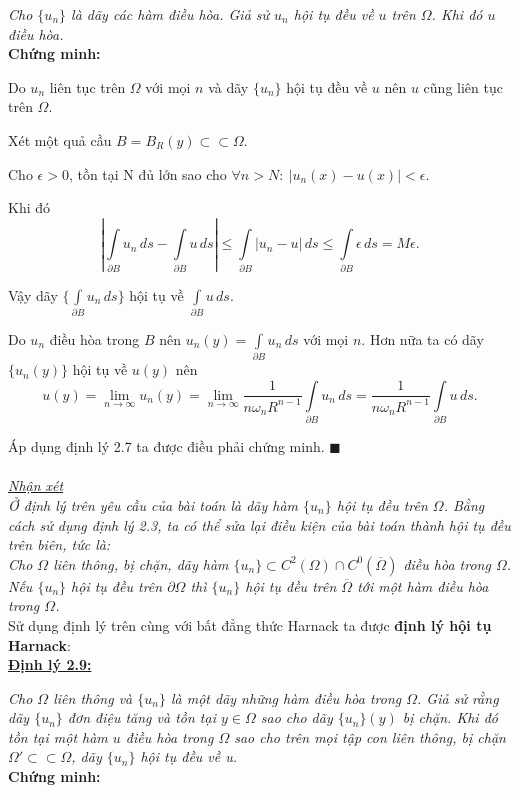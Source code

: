 \textit{Cho $\{u_n\}$ là dãy các hàm điều hòa. Giả sử $u_n$ hội tụ đều về $u$ trên $\Omega$. Khi đó $u$ điều hòa.}
\\
\textbf{Chứng minh:}

Do $u_n$ liên tục trên $\Omega$ với mọi $n$ và dãy $\{u_n\}$ hội tụ đều về $u$ nên $u$ cũng liên tục trên $\Omega$.

Xét một quả cầu $B=B_R(y)\subset\subset\Omega$.

Cho $\epsilon>0$, tồn tại N đủ lớn sao cho $\forall n>N:\ |u_{n}(x)-u(x)|<\epsilon$.

Khi đó
\[|\int\limits_{\partial B}u_{n}\,ds-\int\limits_{\partial B}u\,ds|\leq\int\limits_{\partial B}|u_n-u|\,ds\leq\int\limits_{\partial B}\epsilon\,ds=M\epsilon.\]

Vậy dãy $\{\int\limits_{\partial B}u_n\,ds\}$ hội tụ về $\int\limits_{\partial B}u\,ds$.

Do $u_n$ điều hòa trong $B$ nên $u_n(y)=\int\limits_{\partial B}u_n\,ds$ với mọi $n$. Hơn nữa ta có dãy $\{u_n(y)\}$ hội tụ về $u(y)$ nên
\[u(y)=\lim_{n\to\infty}u_n(y)=\lim_{n\to\infty}\frac{1}{n\omega_n R^{n-1}}\int\limits_{\partial B}u_n\,ds=\frac{1}{n\omega_n R^{n-1}}\int\limits_{\partial B}u\,ds.\]

Áp dụng định lý 2.7 ta được điều phải chứng minh. $\blacksquare$
\\
\\
\textit{\underline{Nhận xét}
\\
Ở định lý trên yêu cầu của bài toán là dãy hàm $\{u_n\}$ hội tụ đều trên $\Omega$. Bằng cách sử dụng định lý 2.3, ta có thể sửa lại điều kiện của bài toán thành hội tụ đều trên biên, tức là:
\\
Cho $\Omega$ liên thông, bị chặn, dãy hàm $\{u_n\}\subset C^2(\Omega)\cap C^0(\overline{\Omega})$ điều hòa trong $\Omega$. Nếu $\{u_n\}$ hội tụ đều trên $\partial\Omega$ thì $\{u_n\}$ hội tụ đều trên $\overline\Omega$ tới một hàm điều hòa trong $\Omega$.}
\\

Sử dụng định lý trên cùng với bất đẳng thức Harnack ta được \textbf{định lý hội tụ Harnack}:\\
\textbf{\underline{Định lý 2.9:}}

\textit{Cho $\Omega$ liên thông và $\{u_n\}$ là một dãy những hàm điều hòa trong $\Omega$. Giả sử rằng dãy $\{u_n\}$ đơn điệu tăng và tồn tại $y\in\Omega$ sao cho dãy $\{u_n\}(y)$ bị chặn. Khi đó tồn tại một hàm $u$ điều hòa trong $\Omega$ sao cho trên mọi tập con liên thông, bị chặn $\Omega'\subset\subset\Omega$, dãy $\{u_n\}$ hội tụ đều về u.}
\\
\textbf{Chứng minh:}

